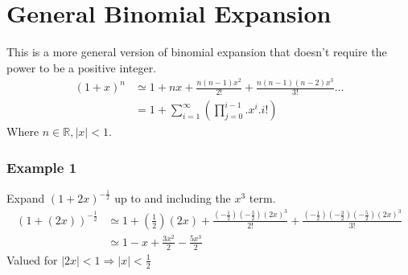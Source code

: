 \documentclass[class=article, crop=false]{standalone}
\begin{document}
\section*{General Binomial Expansion}
This is a more general version of binomial expansion that doesn't require the power to be a positive integer. \\
\begin{align*}
(1+x)^n & \simeq 1 + nx + \frac{n(n-1)x^2}{2!} + \frac{n(n-1)(n-2)x^3}{3!} \dots \\
& = 1 + \sum^{\infty}_{i = 1} (\prod^{i-1}_{j = 0} . x^i . i!)
\end{align*} 
Where $n \in \mathbb{R}, |x| < 1$. \\
\subsubsection*{Example 1}
Expand $(1+2x)^{-\frac{1}{2}}$ up to and including the $x^3$ term. 
\begin{align*}
(1+(2x))^{-\frac{1}{2}} & \simeq 1 + (\frac{1}{2})(2x) + \frac{(-\frac{1}{2})(-\frac{3}{2})(2x)^3}{2!} + \frac{(-\frac{1}{2})(-\frac{3}{2})(-\frac{5}{2})(2x)^3}{3!} \\ 
& \simeq 1 -x + \frac{3x^2}{2} - \frac{5x^3}{2}
\end{align*}
Valued for $|2x| < 1 \Rightarrow |x| < \frac{1}{2}$\\
\end{document}
